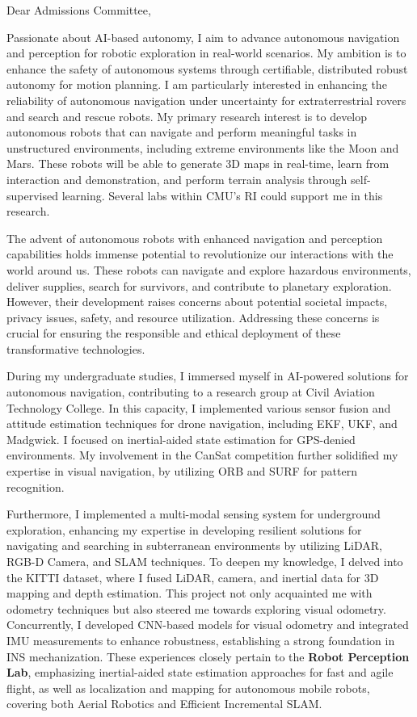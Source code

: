 \documentclass[a4,20pt]{article}
\begin{document}
\begin{large} 
Dear Admissions Committee,

Passionate about AI-based autonomy, I aim to advance autonomous navigation and perception for robotic exploration in real-world scenarios. My ambition is to enhance the safety of autonomous systems through certifiable, distributed robust autonomy for motion planning. I am particularly interested in enhancing the reliability of autonomous navigation under uncertainty for extraterrestrial rovers and search and rescue robots. My primary research interest is to develop autonomous robots that can navigate and perform meaningful tasks in unstructured environments, including extreme environments like the Moon and Mars. These robots will be able to generate 3D maps in real-time, learn from interaction and demonstration, and perform terrain analysis through self-supervised learning. Several labs within CMU's RI could support me in this research.

The advent of autonomous robots with enhanced navigation and perception capabilities holds immense potential to revolutionize our interactions with the world around us. These robots can navigate and explore hazardous environments, deliver supplies, search for survivors, and contribute to planetary exploration. However, their development raises concerns about potential societal impacts, privacy issues, safety, and resource utilization. Addressing these concerns is crucial for ensuring the responsible and ethical deployment of these transformative technologies.

During my undergraduate studies, I immersed myself in AI-powered solutions for autonomous navigation, contributing to a research group at Civil Aviation Technology College. In this capacity, I implemented various sensor fusion and attitude estimation techniques for drone navigation, including EKF, UKF, and Madgwick. I focused on inertial-aided state estimation for GPS-denied environments. My involvement in the CanSat competition further solidified my expertise in visual navigation, by utilizing ORB and SURF for pattern recognition. 

Furthermore, I implemented a multi-modal sensing system for underground exploration, enhancing my expertise in developing resilient solutions for navigating and searching in subterranean environments by utilizing LiDAR, RGB-D Camera, and SLAM techniques. To deepen my knowledge, I delved into the KITTI dataset, where I fused LiDAR, camera, and inertial data for 3D mapping and depth estimation. This project not only acquainted me with odometry techniques but also steered me towards exploring visual odometry. Concurrently, I developed CNN-based models for visual odometry and integrated IMU measurements to enhance robustness, establishing a strong foundation in INS mechanization. These experiences closely pertain to the \textbf{Robot Perception Lab}, emphasizing inertial-aided state estimation approaches for fast and agile flight, as well as localization and  mapping for autonomous mobile robots, covering both Aerial Robotics and Efficient Incremental SLAM.


\end{large}
\end{document}
